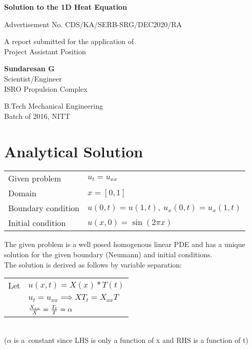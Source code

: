 \documentclass[12pt]{article}
\author{Sundaresan G}
\begin{document}
	
\begin{titlepage}
	\begin{center}
		\vspace*{1cm}
		
		\textbf{\Large{Solution to the 1D Heat Equation}}
		
		\vspace{0.5cm}
		Advertisement No. CDS/KA/SERB-SRG/DEC2020/RA
		
		\vspace{1.5cm}
		
		A report submitted for the application of\\
		Project Assistant Position
		
		
		\vfill
		
		\textbf{\large{Sundaresan G}}\\
		Scientist/Engineer\\
		ISRO Propulsion Complex
		
		\vspace{0.8cm}
		
		B.Tech Mechanical Engineering\\
		Batch of 2016, NITT\\
		
	\end{center}
\end{titlepage}
\tableofcontents

	\section{Analytical Solution}
	\begin{center}
		\begin{tabular}{l l}
			Given problem & $u_t=u_{xx}$\\		
			Domain & $x=[0,1]$\\
			Boundary condition & $u(0,t)=u(1,t),\
			u_x(0,t)=u_x(1,t)$\\
			Initial condition & $u(x,0)=\sin(2\pi x)$
		\end{tabular}
	\end{center}
	The given problem is a well posed homogenous linear PDE and has a unique solution for the given boundary (Neumann) and initial conditions.\\
	The solution is derived as follows by variable separation:\\
	
	\begin{tabular}{r l}
		Let & $u(x,t)=X(x)*T(t)$ \\
		& $u_t=u_{xx} \implies XT_t=X_{xx}T$ \\
		& ${X_{xx}\over X} = {T_t \over T} = \alpha$
		
				
	\end{tabular} \\
	($\alpha$ is a\ constant since LHS is only a function of x and RHS is a function of t)\\
	
\end{document}
